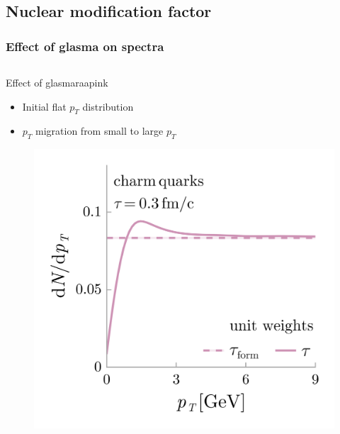 \documentclass[aspectratio=169,11pt,usenames,dvipsnames]{beamer}
\begin{document}
\subsection{Nuclear modification factor}


\begin{frame}
    \frametitle{Effect of glasma on spectra}
    \vspace{-10pt}
    \begin{columns}[onlytextwidth,t]
        \begin{center}
            \begin{custombox}{{\normalsize Effect of glasma}}{raapink}
                \small
                \begin{varwidth}{0.85\textwidth}
                \begin{itemize}
                    \itemsep0em 
                    \footnotesize
                    \item Initial flat $p_T$ distribution
                    \item $p_T$ migration from small to large $p_T$
                \end{itemize}
                \end{varwidth}
            \end{custombox}

            \vspace{-15pt}
            \begin{figure}
                \centering
                \includegraphics[height=0.63\textheight]{images/final_sketch_raa_gl_fonll_v4_gl.png}
            \end{figure}
        \end{center}
        


\end{columns}
\end{frame}
\end{document}
